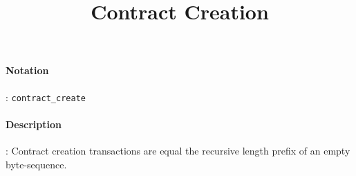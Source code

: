 \documentclass[10pt,a4paper,oneside]{scrartcl}
\author{}
\title{Contract Creation}
\date{}
\begin{document}
\maketitle
\paragraph{Notation}: \texttt{contract\_create}
\paragraph{Description}: Contract creation transactions are equal the recursive length prefix of an empty byte-sequence.
\end{document}
